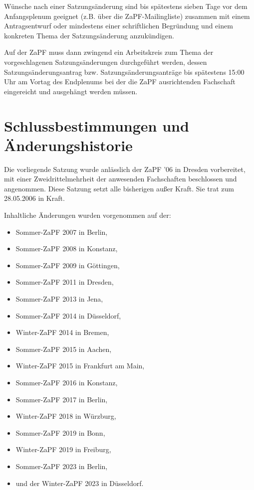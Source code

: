 \documentclass[12pt,oneside]{scrartcl}
\begin{document}
Wünsche nach einer Satzungsänderung sind bis spätestens sieben Tage vor dem
Anfangsplenum geeignet (z.B. über die ZaPF-Mailingliste)
zusammen mit einem Antragsentwurf oder mindestens einer schriftlichen
Begründung und einem konkreten Thema der Satzungsänderung anzukündigen.

Auf der ZaPF muss dann zwingend ein Arbeitskreis zum Thema der vorgeschlagenen
Satzungsänderungen durchgeführt werden, dessen Satzungsänderungsantrag bzw.
Satzungsänderungsanträge bis spätestens 15:00 Uhr am Vortag des Endplenums bei
der die ZaPF ausrichtenden Fachschaft eingereicht und ausgehängt werden müssen.


\section{Schlussbestimmungen und Änderungshistorie%
  \label{schlussbestimmungen-und-anderungshistorie}%
}

Die vorliegende Satzung wurde anlässlich der ZaPF '06 in Dresden vorbereitet,
mit einer Zweidrittelmehrheit der anwesenden Fachschaften beschlossen und
angenommen. Diese Satzung setzt alle bisherigen außer Kraft. Sie trat zum
28.05.2006 in Kraft.

Inhaltliche Änderungen wurden vorgenommen auf der:

\begin{itemize}
\item Sommer-ZaPF 2007 in Berlin,

\item Sommer-ZaPF 2008 in Konstanz,

\item Sommer-ZaPF 2009 in Göttingen,

\item Sommer-ZaPF 2011 in Dresden,

\item Sommer-ZaPF 2013 in Jena,

\item Sommer-ZaPF 2014 in Düsseldorf,

\item Winter-ZaPF 2014 in Bremen,

\item Sommer-ZaPF 2015 in Aachen,

\item Winter-ZaPF 2015 in Frankfurt am Main,

\item Sommer-ZaPF 2016 in Konstanz,

\item Sommer-ZaPF 2017 in Berlin,

\item Winter-ZaPF 2018 in Würzburg,

\item Sommer-ZaPF 2019 in Bonn,

\item Winter-ZaPF 2019 in Freiburg,

\item Sommer-ZaPF 2023 in Berlin,

\item und der Winter-ZaPF 2023 in Düsseldorf.
\end{itemize}
\end{document}
